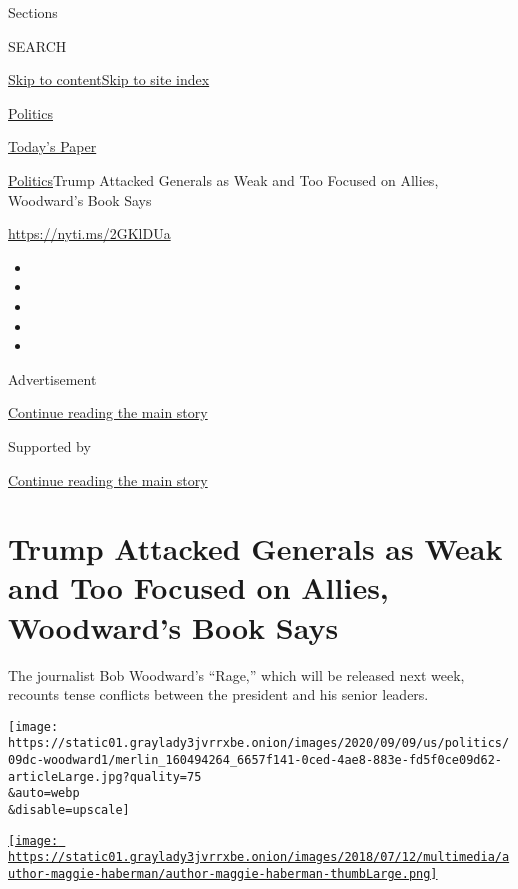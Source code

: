 Sections

SEARCH

\protect\hyperlink{site-content}{Skip to
content}\protect\hyperlink{site-index}{Skip to site index}

\href{https://www.nytimes3xbfgragh.onion/section/politics}{Politics}

\href{https://myaccount.nytimes3xbfgragh.onion/auth/login?response_type=cookie\&client_id=vi}{}

\href{https://www.nytimes3xbfgragh.onion/section/todayspaper}{Today's
Paper}

\href{/section/politics}{Politics}\textbar{}Trump Attacked Generals as
Weak and Too Focused on Allies, Woodward's Book Says

\url{https://nyti.ms/2GKlDUa}

\begin{itemize}
\item
\item
\item
\item
\item
\end{itemize}

Advertisement

\protect\hyperlink{after-top}{Continue reading the main story}

Supported by

\protect\hyperlink{after-sponsor}{Continue reading the main story}

\hypertarget{trump-attacked-generals-as-weak-and-too-focused-on-allies-woodwards-book-says}{%
\section{Trump Attacked Generals as Weak and Too Focused on Allies,
Woodward's Book
Says}\label{trump-attacked-generals-as-weak-and-too-focused-on-allies-woodwards-book-says}}

The journalist Bob Woodward's ``Rage,'' which will be released next
week, recounts tense conflicts between the president and his senior
leaders.

\texttt{[image: https://static01.graylady3jvrrxbe.onion/images/2020/09/09/us/politics/09dc-woodward1/merlin\_160494264\_6657f141-0ced-4ae8-883e-fd5f0ce09d62-articleLarge.jpg?quality=75\\\&auto=webp\\\&disable=upscale]}

\href{https://www.nytimes3xbfgragh.onion/by/maggie-haberman}{\texttt{[image: https://static01.graylady3jvrrxbe.onion/images/2018/07/12/multimedia/author-maggie-haberman/author-maggie-haberman-thumbLarge.png]}}

